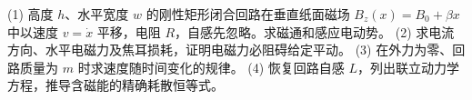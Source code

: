 (1) 高度 \(h\)、水平宽度 \(w\) 的刚性矩形闭合回路在垂直纸面磁场 \(B_z(x)=B_0+\beta x\) 中以速度 \(v=\dot x\) 平移，电阻 \(R\)，自感先忽略。求磁通和感应电动势。
(2) 求电流方向、水平电磁力及焦耳损耗，证明电磁力必阻碍给定平动。
(3) 在外力为零、回路质量为 \(m\) 时求速度随时间变化的规律。
(4) 恢复回路自感 \(L\)，列出联立动力学方程，推导含磁能的精确耗散恒等式。
